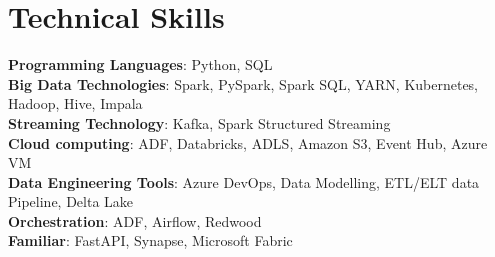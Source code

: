 \documentclass[letterpaper,11pt]{article}
\begin{document}
\section{Technical Skills}
 \begin{itemize}[leftmargin=0.15in, label={}]
    \small{\item{
     \textbf{Programming Languages}{:\hspace{0.06cm}  Python, SQL} \\
     \textbf{Big Data Technologies}{:\hspace{0.49cm}     Spark, PySpark, Spark SQL, YARN, Kubernetes, Hadoop, Hive, Impala } \\
     \textbf{Streaming Technology}{:\hspace{0.51cm} Kafka, Spark Structured Streaming} \\
     \textbf{Cloud computing}{:\hspace{1.38cm} ADF, Databricks, ADLS, Amazon S3, Event Hub, Azure VM } \\
     \textbf{Data Engineering Tools}{:\hspace{0.28cm} Azure DevOps, Data Modelling, ETL/ELT data Pipeline, Delta Lake}\\
     \textbf{Orchestration}{:\hspace{2.02cm} ADF, Airflow, Redwood} \\
     \textbf{Familiar}{:\hspace{3cm} FastAPI, Synapse, Microsoft Fabric} \\
     
     
    }}
 \end{itemize}

\end{document}
